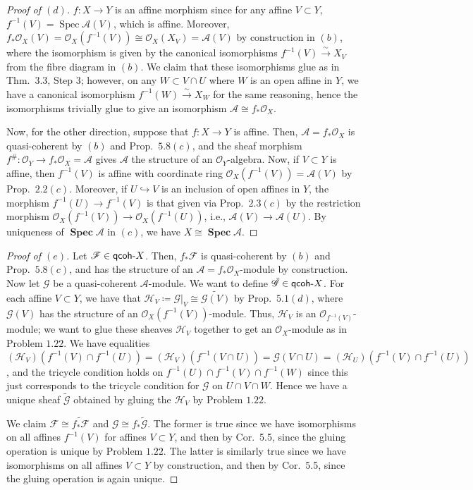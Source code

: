 \documentclass[12pt,letterpaper]{article}
\theoremstyle{definition}
\theoremstyle{remark}
\numberwithin{equation}{section}
\numberwithin{figure}{problem}
\DeclareMathOperator{\Spec}{Spec}
\DeclareMathOperator{\SPEC}{\mathbf{Spec}}
\newcommand{\FF}{\mathscr{F}}
\newcommand{\GG}{\mathscr{G}}
\newcommand{\HH}{\mathscr{H}}
\newcommand{\OO}{\mathcal{O}}
\newcommand{\Aa}{\mathscr{A}}
\newcommand{\isoto}{\overset{\sim}{\to}}
\newcommand{\qcoh}{\mathsf{qcoh}\mathchar`-}
\begin{document}
\begin{proof}[Proof of $(d)$]
  $f\colon X \to Y$ is an affine morphism since for any affine $V \subset Y$, $f^{-1}(V) = \Spec \Aa(V)$, which is affine. Moreover, $f_*\OO_X(V) = \OO_X(f^{-1}(V)) \cong \OO_X(X_V) = \Aa(V)$ by construction in $(b)$, where the isomorphism is given by the canonical isomorphisms $f^{-1}(V) \isoto X_V$ from the fibre diagram in $(b)$. We claim that these isomorphisms glue as in Thm.~3.3, Step 3; however, on any $W \subset V \cap U$ where $W$ is an open affine in $Y$, we have a canonical isomorphism $f^{-1}(W) \isoto X_W$ for the same reasoning, hence the isomorphisms trivially glue to give an isomorphism $\Aa \cong f_*\OO_X$.
  \par Now, for the other direction, suppose that $f\colon X \to Y$ is affine. Then, $\Aa = f_*\OO_X$ is quasi-coherent by $(b)$ and Prop.~$5.8(c)$, and the sheaf morphism $f^\#\colon \OO_Y \to f_*\OO_X = \Aa$ gives $\Aa$ the structure of an $\OO_Y$-algebra. Now, if $V \subset Y$ is affine, then $f^{-1}(V)$ is affine with coordinate ring $\OO_X(f^{-1}(V)) = \Aa(V)$ by Prop.~$2.2(c)$. Moreover, if $U \hookrightarrow V$ is an inclusion of open affines in $Y$, the morphism $f^{-1}(U) \to f^{-1}(V)$ is that given via Prop.~$2.3(c)$ by the restriction morphism $\OO_X(f^{-1}(V)) \to \OO_X(f^{-1}(U))$, i.e., $\Aa(V) \to \Aa(U)$. By uniqueness of $\SPEC \Aa$ in $(c)$, we have $X \cong \SPEC \Aa$.
\end{proof}
\begin{proof}[Proof of $(e)$]
  Let $\FF\in \qcoh X$. Then, $f_*\FF$ is quasi-coherent by $(b)$ and Prop.~$5.8(c)$, and has the structure of an $\Aa = f_*\OO_X$-module by construction. Now let $\GG$ be a quasi-coherent $\Aa$-module. We want to define $\tilde{\GG} \in \qcoh X$. For each affine $V \subset Y$, we have that $\HH_V \coloneqq \GG\vert_V \cong \widetilde{\GG(V)}$ by Prop.~$5.1(d)$, where $\GG(V)$ has the structure of an $\OO_X(f^{-1}(V))$-module. Thus, $\HH_V$ is an $\OO_{f^{-1}(V)}$-module; we want to glue these sheaves $\HH_V$ together to get an $\OO_X$-module as in Problem $1.22$. We have equalities $(\HH_V)(f^{-1}(V) \cap f^{-1}(U)) = (\HH_V)(f^{-1}(V \cap U)) = \GG(V \cap U) = (\HH_U)(f^{-1}(V) \cap f^{-1}(U))$, and the tricycle condition holds on $f^{-1}(U) \cap f^{-1}(V) \cap f^{-1}(W)$ since this just corresponds to the tricycle condition for $\GG$ on $U \cap V \cap W$. Hence we have a unique sheaf $\tilde{\GG}$ obtained by gluing the $\HH_V$ by Problem $1.22$.
  \par We claim $\FF \cong \widetilde{f_*\FF}$ and $\GG \cong f_*\tilde{\GG}$. The former is true since we have isomorphisms on all affines $f^{-1}(V)$ for affines $V \subset Y$, and then by Cor.~5.5, since the gluing operation is unique by Problem $1.22$. The latter is similarly true since we have isomorphisms on all affines $V \subset Y$ by construction, and then by Cor.~5.5, since the gluing operation is again unique.
\end{proof}
\end{document}
